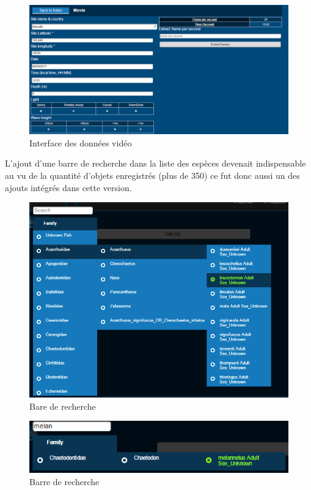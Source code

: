 \documentclass[12pt]{article}
\begin{document}
\begin{figure}[H]
\centering
\includegraphics[width=1\textwidth]{img/OIA_V2/oia_v2_08.png}
 \caption{Interface des données vidéo}
 \label{fig:donnee_video}
\end{figure}

\par
L’ajout d’une barre de recherche dans la liste des espèces devenait indispensable au vu de la quantité d’objets enregistrés (plus de 350) ce fut donc aussi un des ajouts intégrés dans cette version.
\begin{figure}[H]
\centering
\includegraphics[width=1\textwidth]{img/OIA_V1/oia_v1_04.png}
 \caption{Bare de recherche}
 \label{fig:donnee_video}
\end{figure}
\begin{figure}[H]
\centering
\includegraphics[width=1\textwidth]{img/OIA_V2/oia_v2_09.png}
 \caption{Barre de recherche}
 \label{fig:donnee_video}
\end{figure}
\end{document}
